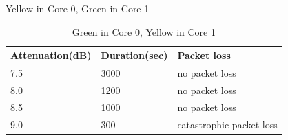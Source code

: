 \documentclass{article}
\begin{document}
{\begin{table}[ht]
\begin{minipage}{.5\textwidth}
\caption{Yellow in Core 0, Green in Core 1}
\label{table:greencore1}
\end{minipage}
\begin{minipage}{.5\textwidth}
\begin{center}
\begin{tabular}{|p{2.5cm}|p{2.5cm}|p{2.5cm}|}
	\hline
	 Attenuation(dB) & Duration(sec) & Packet loss \\ \hline
	 7.5  & 3000 &  no packet loss \\ \hline
	 8.0  &  1200 & no packet loss \\ \hline
	 8.5  & 1000 & no packet loss \\ \hline
	 9.0  & 300 & catastrophic packet loss \\ \hline
\end{tabular}
\end{center}
\caption{Green in Core 0, Yellow in Core 1}
\label{table:greencore0}
\end{minipage}
\end{table}
}
\end{document}
